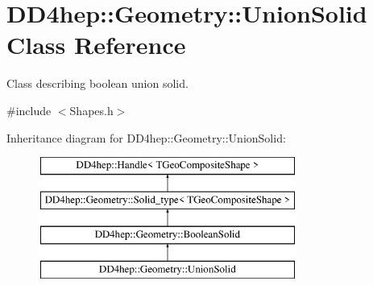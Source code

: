 \hypertarget{class_d_d4hep_1_1_geometry_1_1_union_solid}{}\section{D\+D4hep\+:\+:Geometry\+:\+:Union\+Solid Class Reference}
\label{class_d_d4hep_1_1_geometry_1_1_union_solid}


Class describing boolean union solid.  




{\ttfamily \#include $<$Shapes.\+h$>$}

Inheritance diagram for D\+D4hep\+:\+:Geometry\+:\+:Union\+Solid\+:\begin{figure}[H]
\begin{center}
\leavevmode
\includegraphics[height=4.000000cm]{class_d_d4hep_1_1_geometry_1_1_union_solid}
\end{center}
\end{figure}

